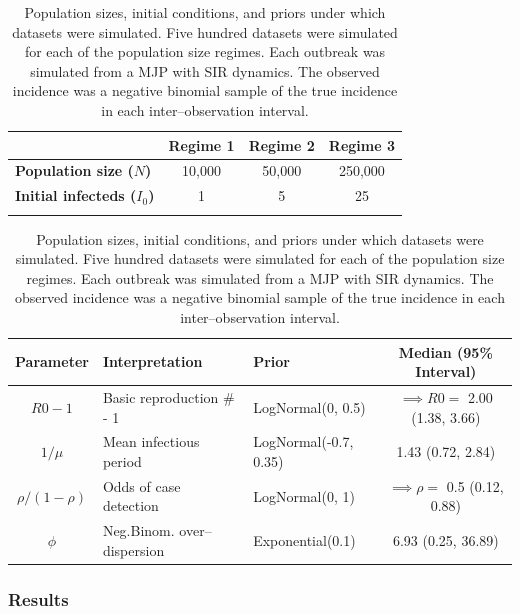 \begin{table}[htbp]
	\caption[LNA coverage simulation settings.]{Population sizes, initial conditions, and priors under which datasets were simulated. Five hundred datasets were simulated for each of the population size regimes. Each outbreak was simulated from a MJP with SIR dynamics. The observed incidence was a negative binomial sample of the true incidence in each inter--observation interval.}
	\label{tab:lna_coverage_sim}
	\footnotesize
	\centering
	\begin{tabular}{lccc}
		\hline
		& \textbf{Regime 1} & \textbf{Regime 2} & \textbf{Regime 3} \\\hline
		\textbf{Population size ($ N $)} & 10,000 & 50,000 & 250,000 \\ 
		\textbf{Initial infecteds ($ I_0 $)} & 1 & 5 & 25 \\
		\hline
		&&&
	\end{tabular} 

	\begin{tabular}{cllc}
		\hline
		\textbf{Parameter} & \textbf{Interpretation} & \textbf{Prior} & \textbf{Median (95\% Interval)} \\ \hline
		$ R0-1 $ & Basic reproduction \# - 1 & LogNormal(0, 0.5) & $ \implies R0 = $ 2.00 (1.38, 3.66) \\ 
		$ 1/\mu $ & Mean infectious period & LogNormal(-0.7, 0.35)& 1.43 (0.72, 2.84) \\
		$ \rho / (1-\rho) $ & Odds of case detection & LogNormal(0, 1) & $ \implies \rho =$ 0.5 (0.12, 0.88) \\
		$ \phi $ & Neg.Binom. over--dispersion & Exponential(0.1) & 6.93 (0.25, 36.89)\\
		\hline
	\end{tabular}
\end{table}

\subsubsection{Results}

